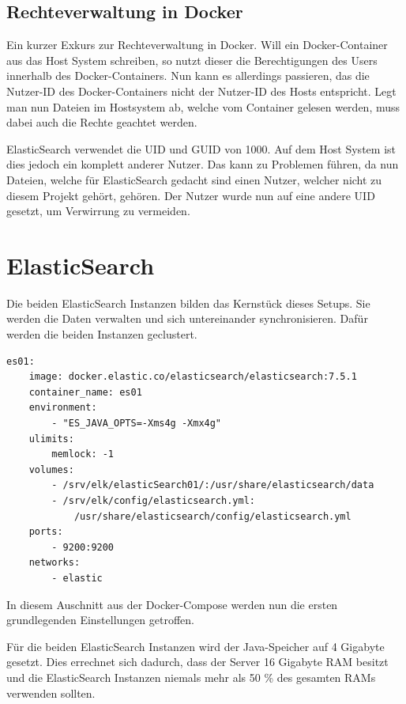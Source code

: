 \subsection{Rechteverwaltung in Docker}

Ein kurzer Exkurs zur Rechteverwaltung in Docker. Will ein Docker-Container aus das Host System schreiben, so nutzt dieser die Berechtigungen des Users innerhalb des Docker-Containers. Nun kann es allerdings passieren, das die Nutzer-ID des Docker-Containers nicht der Nutzer-ID des Hosts entspricht. Legt man nun Dateien im Hostsystem ab, welche vom Container gelesen werden, muss dabei auch die Rechte geachtet werden. 

ElasticSearch verwendet die UID und GUID von 1000. Auf dem Host System ist dies jedoch ein komplett anderer Nutzer. Das kann zu Problemen führen, da nun Dateien, welche für ElasticSearch gedacht sind einen Nutzer, welcher nicht zu diesem Projekt gehört, gehören. Der Nutzer wurde nun auf eine andere UID gesetzt, um Verwirrung zu vermeiden. \cite{JarrodWeaver.2014}

\section{ElasticSearch}

Die beiden ElasticSearch Instanzen bilden das Kernstück dieses Setups. Sie werden die Daten verwalten und sich untereinander synchronisieren. Dafür werden die beiden Instanzen geclustert.

\begin{lstlisting}[language=XML, frame=single, label={lst:es01}] 
	es01:
	image: docker.elastic.co/elasticsearch/elasticsearch:7.5.1
	container_name: es01
	environment:
		- "ES_JAVA_OPTS=-Xms4g -Xmx4g"
	ulimits:
		memlock: -1
	volumes:
		- /srv/elk/elasticSearch01/:/usr/share/elasticsearch/data
		- /srv/elk/config/elasticsearch.yml:
			/usr/share/elasticsearch/config/elasticsearch.yml
	ports:
		- 9200:9200
	networks:
		- elastic
\end{lstlisting}

In diesem Auschnitt aus der Docker-Compose werden nun die ersten grundlegenden Einstellungen getroffen.

Für die beiden ElasticSearch Instanzen wird der Java-Speicher auf 4 Gigabyte gesetzt. Dies errechnet sich dadurch, dass der Server 16 Gigabyte RAM besitzt und die ElasticSearch Instanzen niemals mehr als 50 \% des gesamten RAMs verwenden sollten. \cite{ElasticsearchB.V..12172019}

